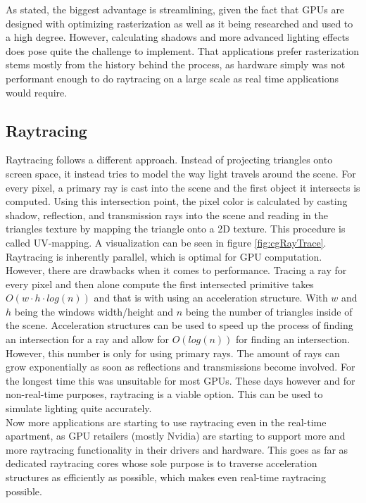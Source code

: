 As stated, the biggest advantage is streamlining, given the fact that GPUs are designed with optimizing rasterization as well as it being researched and used to a high degree. However, calculating shadows and more advanced lighting effects does pose quite the challenge to implement. That applications prefer rasterization stems mostly from the history behind the process, as hardware simply was not performant enough to do raytracing on a large scale as real time applications would require.
\subsection{Raytracing}
Raytracing follows a different approach. Instead of projecting triangles onto screen space, it instead tries to model the way light travels around the scene. For every pixel, a primary ray is cast into the scene and the first object it intersects is computed. Using this intersection point, the pixel color is calculated by casting shadow, reflection, and transmission rays into the scene and reading in the triangles texture by mapping the triangle onto a 2D texture. This procedure is called UV-mapping. A visualization can be seen in figure \ref{fig:cgRayTrace}.\\
Raytracing is inherently parallel, which is optimal for GPU computation. However, there are drawbacks when it comes to performance. Tracing a ray for every pixel and then alone compute the first intersected primitive takes $O(w\cdot h\cdot log(n))$ and that is with using an acceleration structure. With $w$ and $h$ being the windows width/height and $n$ being the number of triangles inside of the scene. Acceleration structures can be used to speed up the process of finding an intersection for a ray and allow for $O(log(n))$ for finding an intersection. However, this number is only for using primary rays. The amount of rays can grow exponentially as soon as reflections and transmissions become involved. For the longest time this was unsuitable for most GPUs. These days however and for non-real-time purposes, raytracing is a viable option. This can be used to simulate lighting quite accurately.\\
Now more applications are starting to use raytracing even in the real-time apartment, as GPU retailers (mostly Nvidia) are starting to support more and more raytracing functionality in their drivers and hardware. This goes as far as dedicated raytracing cores whose sole purpose is to traverse acceleration structures as efficiently as possible, which makes even real-time raytracing possible.
